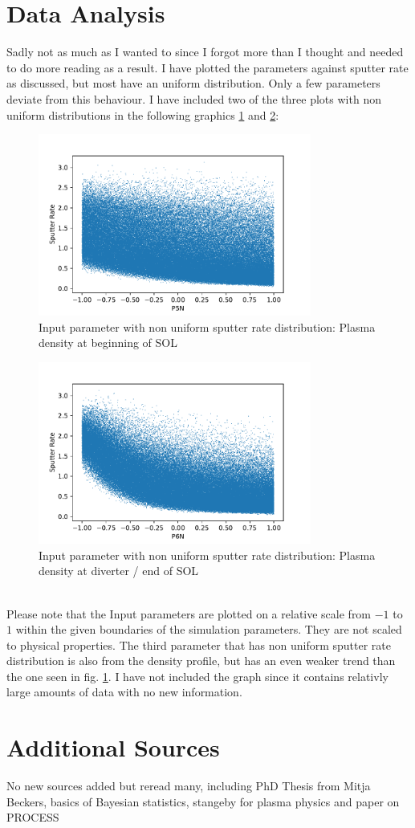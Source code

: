 \documentclass[a4paper,12pt]{article}
\begin{document}
\section{Data Analysis}
	Sadly not as much as I wanted to since I forgot more than I thought and needed to do more reading as a result.
	I have plotted the parameters against sputter rate as discussed, but most have an uniform distribution. Only a few parameters deviate from this behaviour. I have included two of the three plots with non uniform distributions in the following graphics \ref{P5N} and \ref{P6N}:\\
		\begin{figure}
			\includegraphics[width=0.8\textwidth]{../Thesis/images/P5N.pdf}
			\caption{Input parameter with non uniform sputter rate distribution: Plasma density at beginning of SOL}
			\label{P5N}
		\end{figure}
		\begin{figure}
			\includegraphics[width=0.8\textwidth]{../Thesis/images/P6N.pdf}
			\caption{Input parameter with non uniform sputter rate distribution: Plasma density at diverter / end of SOL}
			\label{P6N}
		\end{figure}
	~\\
	Please note that the Input parameters are plotted on a relative scale from $-1$ to $1$ within the given boundaries of the simulation parameters. They are not scaled to physical properties. The third parameter that has non uniform sputter rate distribution is also from the density profile, but has an even weaker trend than the one seen in fig. \ref{P5N}. I have not included the graph since it contains relativly large amounts of data with no new information.
\section{Additional Sources}
	No new sources added but reread many, including PhD Thesis from Mitja Beckers, basics of Bayesian statistics, stangeby for plasma physics and paper on PROCESS
\appendix
\end{document}
